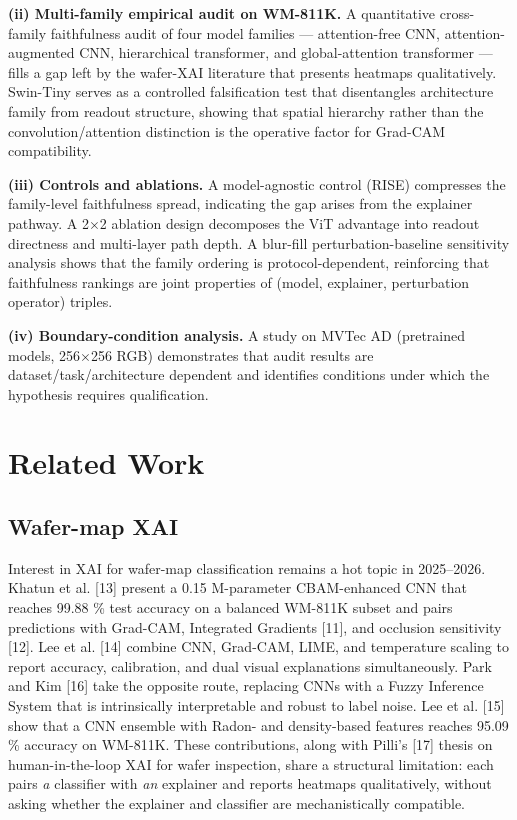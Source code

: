 \documentclass[11pt,a4paper]{article}
\begin{document}
\textbf{(ii) Multi-family empirical audit on WM-811K.} A quantitative cross-family faithfulness audit of four model families --- attention-free CNN, attention-augmented CNN, hierarchical transformer, and global-attention transformer --- fills a gap left by the wafer-XAI literature that presents heatmaps qualitatively. Swin-Tiny serves as a controlled falsification test that disentangles architecture family from readout structure, showing that spatial hierarchy rather than the convolution/attention distinction is the operative factor for Grad-CAM compatibility.

\textbf{(iii) Controls and ablations.} A model-agnostic control (RISE) compresses the family-level faithfulness spread, indicating the gap arises from the explainer pathway. A 2$\times$2 ablation design decomposes the ViT advantage into readout directness and multi-layer path depth. A blur-fill perturbation-baseline sensitivity analysis shows that the family ordering is protocol-dependent, reinforcing that faithfulness rankings are joint properties of (model, explainer, perturbation operator) triples.

\textbf{(iv) Boundary-condition analysis.} A study on MVTec AD (pretrained models, 256$\times$256 RGB) demonstrates that audit results are dataset/task/architecture dependent and identifies conditions under which the hypothesis requires qualification.

\section{Related Work}

\subsection{Wafer-map XAI}

Interest in XAI for wafer-map classification remains a hot topic in 2025--2026. Khatun et al. [13] present a 0.15 M-parameter CBAM-enhanced CNN that reaches 99.88 \% test accuracy on a balanced WM-811K subset and pairs predictions with Grad-CAM, Integrated Gradients [11], and occlusion sensitivity [12]. Lee et al. [14] combine CNN, Grad-CAM, LIME, and temperature scaling to report accuracy, calibration, and dual visual explanations simultaneously. Park and Kim [16] take the opposite route, replacing CNNs with a Fuzzy Inference System that is intrinsically interpretable and robust to label noise. Lee et al. [15] show that a CNN ensemble with Radon- and density-based features reaches 95.09 \% accuracy on WM-811K. These contributions, along with Pilli's [17] thesis on human-in-the-loop XAI for wafer inspection, share a structural limitation: each pairs \emph{a} classifier with \emph{an}
explainer and reports heatmaps qualitatively, without asking whether the explainer and classifier are mechanistically compatible.
\end{document}
